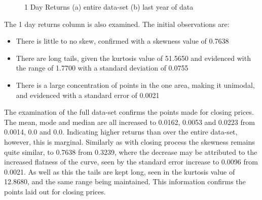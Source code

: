 \begin{figure}[h!]
    \centering
    \caption{1 Day Returns (a) entire data-set (b) last year of data}
    \label{fig:1returnDesc}
\end{figure}

The 1 day returns column is also examined. The initial observations are:
\begin{itemize}
    \item There is little to no skew, confirmed with a skewness value of 0.7638
    \item There are long tails, given the kurtosis value of 51.5650 and evidenced with the range of 1.7700 with a standard deviation of 0.0755
    \item There is a large concentration of points in the one area, making it unimodal, and evidenced with a standard error of 0.0021
\end{itemize}
The examination of the full data-set confirms the points made for closing prices. The mean, mode and median are all increased to 0.0162, 0.0053 and 0.0223 from 0.0014, 0.0 and 0.0. Indicating higher returns than over the entire data-set, however, this is marginal. Similarly as with closing process the skewness remains quite similar, to 0.7638 from 0.3239, where the decrease may be attributed to the increased flatness of the curve, seen by the standard error increase to 0.0096 from 0.0021. As well as this the tails are kept long, seen in the kurtosis value of 12.8680, and the same range being maintained. This information confirms the points laid out for closing prices.

